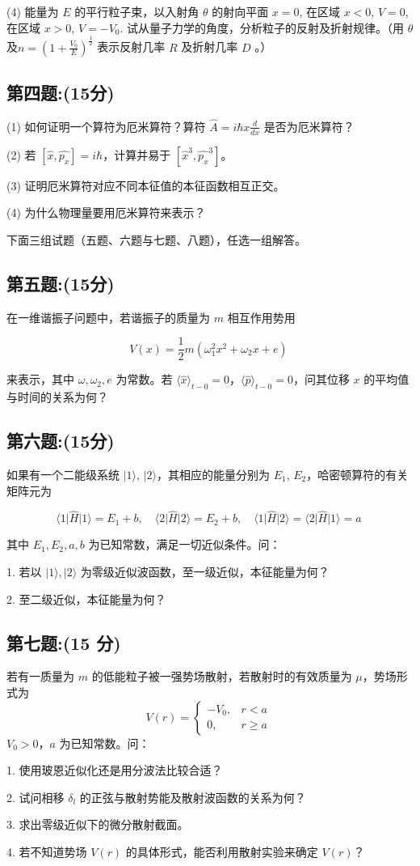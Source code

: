 (4) 
能量为 $E$ 的平行粒子束，以入射角 $\theta$ 的射向平面 $x = 0$, 在区域 $x < 0$, $V = 0$, 在区域 $x > 0$, $V = -V_0$. 试从量子力学的角度，分析粒子的反射及折射规律。（用 $\theta$ 及$n = \left( 1 + \frac{V_0}{E} \right)^{\frac{1}{2}}$
表示反射几率 $R$ 及折射几率 $D$ 。）
\subsection{第四题:(15分)}
(1) 如何证明一个算符为厄米算符？算符 $\hat{A} = i \hbar x \frac{d}{dx}$ 是否为厄米算符？

(2) 若 $[\hat{x}, \hat{p_x}] = i\hbar$，计算并易于 $[\hat{x}^3, \hat{p_x}^3]$。

(3) 证明厄米算符对应不同本征值的本征函数相互正交。

(4) 为什么物理量要用厄米算符来表示？

下面三组试题（五题、六题与七题、八题），任选一组解答。
\subsection{第五题:(15分)}
在一维谐振子问题中，若谐振子的质量为 \(m\) 相互作用势用 

\[
V(x) = \frac{1}{2} m(\omega_1^2 x^2 + \omega_2 x + e)~
\]

来表示，其中 \(\omega, \omega_2, e\) 为常数。若 \(\langle \hat{x} \rangle_{t-0} = 0\)，\(\langle \hat{p} \rangle_{t-0} = 0\)，问其位移 \(x\) 的平均值与时间的关系为何？
\subsection{第六题:(15分)}
如果有一个二能级系统 \(\lvert 1 \rangle\), \(\lvert 2 \rangle\)，其相应的能量分别为 \(E_1\), \(E_2\)，哈密顿算符的有关矩阵元为

\[
\langle 1 \lvert \hat{H} \rvert 1 \rangle = E_1 + b, \quad \langle 2 \lvert \hat{H} \rvert 2 \rangle = E_2 + b, \quad \langle 1 \lvert \hat{H} \rvert 2 \rangle = \langle 2 \lvert \hat{H} \rvert 1 \rangle = a~
\]

其中 \(E_1, E_2, a, b\) 为已知常数，满足一切近似条件。问：

1. 若以 \(\lvert 1 \rangle, \lvert 2 \rangle\) 为零级近似波函数，至一级近似，本征能量为何？

2. 至二级近似，本征能量为何？
\subsection{第七题:(15 分)}
若有一质量为 $m$ 的低能粒子被一强势场散射，若散射时的有效质量为 $\mu$，势场形式为
$$
V(r) =
\begin{cases}
-V_0, & r < a \\
0, & r \geq a
\end{cases}~
$$
$V_0 > 0$，$a$ 为已知常数。问：

1. 使用玻恩近似化还是用分波法比较合适？

2. 试问相移 $\delta_l$ 的正弦与散射势能及散射波函数的关系为何？

3. 求出零级近似下的微分散射截面。

4. 若不知道势场 $V(r)$ 的具体形式，能否利用散射实验来确定 $V(r)$？

